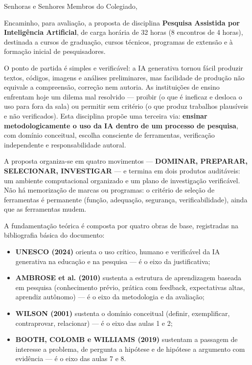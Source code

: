\documentclass[11pt,a4paper]{article}
\begin{document}
Senhoras e Senhores Membros do Colegiado,

Encaminho, para avaliação, a proposta de disciplina \textbf{Pesquisa Assistida por
Inteligência Artificial}, de carga horária de 32 horas (8 encontros de 4 horas), destinada a
cursos de graduação, cursos técnicos, programas de extensão e à formação inicial de
pesquisadores.

O ponto de partida é simples e verificável: a IA generativa tornou fácil produzir textos,
códigos, imagens e análises preliminares, mas facilidade de produção não equivale a
compreensão, correção nem autoria. As instituições de ensino enfrentam hoje um dilema mal
resolvido --- proibir (o que é ineficaz e desloca o uso para fora da sala) ou permitir sem
critério (o que produz trabalhos plausíveis e não verificados). Esta disciplina propõe uma
terceira via: \textbf{ensinar metodologicamente o uso da IA dentro de um processo de
pesquisa}, com domínio conceitual, escolha consciente de ferramentas, verificação
independente e responsabilidade autoral.

A proposta organiza-se em quatro movimentos --- \textbf{DOMINAR, PREPARAR, SELECIONAR,
INVESTIGAR} --- e termina em dois produtos auditáveis: um ambiente computacional organizado e
um plano de investigação verificável. Não há memorização de marcas ou programas: o critério
de seleção de ferramentas é permanente (função, adequação, segurança, verificabilidade),
ainda que as ferramentas mudem.

A fundamentação teórica é composta por quatro obras de base, registradas na bibliografia
básica do documento:

\begin{itemize}
\item \textbf{UNESCO (2024)} orienta o uso crítico, humano e verificável da IA generativa na
educação e na pesquisa --- é o eixo da justificativa;
\item \textbf{AMBROSE et al. (2010)} sustenta a estrutura de aprendizagem baseada em pesquisa
(conhecimento prévio, prática com feedback, expectativas altas, aprendiz autônomo) --- é o
eixo da metodologia e da avaliação;
\item \textbf{WILSON (2001)} sustenta o domínio conceitual (definir, exemplificar, contraprovar,
relacionar) --- é o eixo das aulas 1 e 2;
\item \textbf{BOOTH, COLOMB e WILLIAMS (2019)} sustentam a passagem de interesse a problema, de
pergunta a hipótese e de hipótese a argumento com evidência --- é o eixo das aulas 7 e 8.
\end{itemize}
\end{document}
